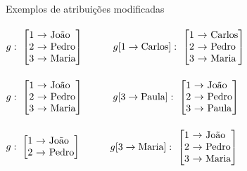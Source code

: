\begin{exe}
	\ex Exemplos de atribuições modificadas \\\\
	$g:\ \left[%
	\begin{array}{@{}c@{\ }l@{\ }l@{}}%
	1 & \rightarrow& \text{João} \\
	2 & \rightarrow & \text{Pedro} \\
	3 & \rightarrow & \text{Maria} \\
	\end{array}\right]$\ \ \ \ \ \ $g[1\rightarrow \text{Carlos}]:\ \left[%
	\begin{array}{@{}c@{\ }l@{\ }l@{}}%
	1 & \rightarrow& \text{Carlos} \\
	2 & \rightarrow & \text{Pedro} \\
	3 & \rightarrow & \text{Maria} \\
	\end{array}\right]$\\\\

	$g:\ \left[%
	\begin{array}{@{}c@{\ }l@{\ }l@{}}%
	1 & \rightarrow& \text{João} \\
	2 & \rightarrow & \text{Pedro} \\
	3 & \rightarrow & \text{Maria} \\
	\end{array}\right]$\ \ \ \ \ \ $g[3 \rightarrow \text{Paula}]:\ \left[%
	\begin{array}{@{}c@{\ }l@{\ }l@{}}%
	1 & \rightarrow& \text{João} \\
	2 & \rightarrow & \text{Pedro} \\
	3 & \rightarrow & \text{Paula} \\
	\end{array}\right]$\\\\

	$g:\ \left[%
	\begin{array}{@{}c@{\ }l@{\ }l@{}}%
	1 & \rightarrow& \text{João} \\
	2 & \rightarrow & \text{Pedro} \\
	\end{array}\right]$\ \ \ \ \ \ $g[3 \rightarrow \text{Maria}]:\ \left[%
	\begin{array}{@{}c@{\ }l@{\ }l@{}}%
	1 & \rightarrow& \text{João} \\
	2 & \rightarrow & \text{Pedro} \\
	3 & \rightarrow & \text{Maria} \\
	\end{array}\right]$
\end{exe}

